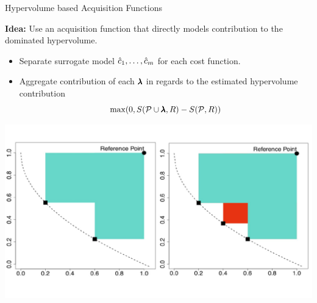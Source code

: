\begin{frame}{Hypervolume based Acquisition Functions}

    \textbf{Idea:} Use an acquisition function that directly models contribution to the dominated hypervolume.

    \vspace{0.5cm}

    \begin{itemize}
        \item Separate surrogate model $\hat{c}_1, \dots, \hat{c}_m$ for each cost function.
        \item Aggregate contribution of each $\pmb{\lambda}$ in regards to the estimated hypervolume contribution
            $$
            \max(0, S(\mathcal{P} \cup \pmb{\lambda}, R) - S(\mathcal{P}, R))
            $$
    \end{itemize}

    \begin{center}
        \includegraphics[scale=0.3]{images/hv_contribution}
    \end{center}


\end{frame}

